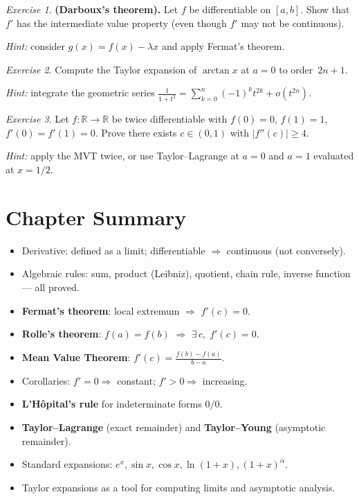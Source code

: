 \documentclass[12pt,a4paper,openany]{book}
\theoremstyle{definition}
\theoremstyle{remark}
\newtheorem{exercise}{Exercise}[chapter]
\begin{document}
\begin{exercise}\label{exo:ch6-10}
\textbf{(Darboux's theorem).}\;
Let $f$ be differentiable on $[a,b]$.  Show that $f'$ has the
intermediate value property (even though $f'$ may not be continuous).

\emph{Hint:} consider $g(x)=f(x)-\lambda x$ and apply Fermat's theorem.
\end{exercise}

\begin{exercise}\label{exo:ch6-11}
Compute the Taylor expansion of $\arctan x$ at $a=0$ to order~$2n+1$.

\emph{Hint:} integrate the geometric series
$\frac{1}{1+t^2}=\sum_{k=0}^{n}(-1)^k t^{2k}+o(t^{2n})$.
\end{exercise}

\begin{exercise}\label{exo:ch6-12}
Let $f\colon\mathbb{R}\to\mathbb{R}$ be twice differentiable with
$f(0)=0$, $f(1)=1$, $f'(0)=f'(1)=0$.  Prove there exists
$c\in(0,1)$ with $|f''(c)|\ge 4$.

\emph{Hint:} apply the MVT twice, or use Taylor--Lagrange at $a=0$
and $a=1$ evaluated at $x=1/2$.
\end{exercise}

\section*{Chapter Summary}

\begin{tcolorbox}[colback=gray!5,colframe=black!50,
  title={Key results of Chapter 6}]
\begin{itemize}[nosep]
\item Derivative: defined as a limit; differentiable $\Rightarrow$
  continuous (not conversely).
\item Algebraic rules: sum, product (Leibniz), quotient, chain rule,
  inverse function --- all proved.
\item \textbf{Fermat's theorem}: local extremum $\Rightarrow$
  $f'(c)=0$.
\item \textbf{Rolle's theorem}: $f(a)=f(b)$ $\Rightarrow$ $\exists\,
  c,\;f'(c)=0$.
\item \textbf{Mean Value Theorem}: $f'(c)=\frac{f(b)-f(a)}{b-a}$.
\item Corollaries: $f'=0\Rightarrow$ constant; $f'>0\Rightarrow$
  increasing.
\item \textbf{L'H\^opital's rule} for indeterminate forms $0/0$.
\item \textbf{Taylor--Lagrange} (exact remainder) and
  \textbf{Taylor--Young} (asymptotic remainder).
\item Standard expansions: $e^x,\sin x,\cos x,\ln(1+x),(1+x)^\alpha$.
\item Taylor expansions as a tool for computing limits and asymptotic
  analysis.
\end{itemize}
\end{tcolorbox}
\end{document}
